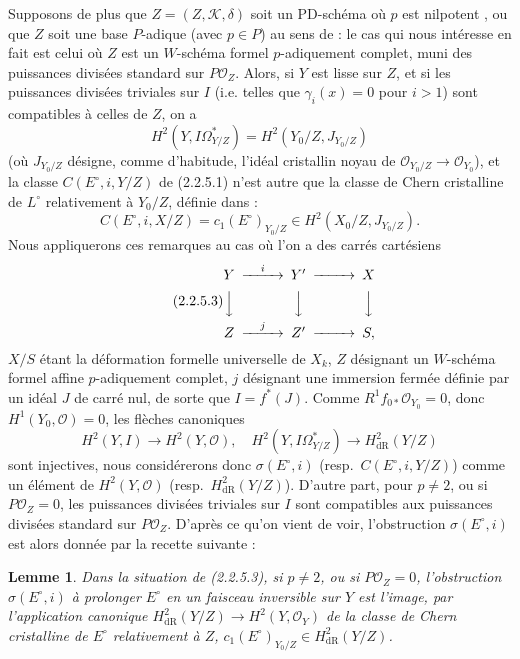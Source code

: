 \documentclass[12pt,a4paper]{article}
\theoremstyle{plain}
\newtheorem{lemma}[theorem]{Lemme}
\theoremstyle{definition}
\theoremstyle{remark}
\begin{document}
Supposons de plus que $Z = (Z, \mathcal{K}, \delta)$ soit un PD-sch\'ema o\`u $p$ est nilpotent \cite{Berthelot}, ou que $Z$ soit une base $P$-adique (avec $p \in P$) au sens de \cite[7.17]{BerthelotOgus} : le cas qui nous int\'eresse en fait est celui o\`u $Z$ est un $W$-sch\'ema formel $p$-adiquement complet, muni des puissances divis\'ees standard sur $P\mathcal{O}_Z$. Alors, si $Y$ est lisse sur $Z$, et si les puissances divis\'ees triviales sur $I$ (i.e. telles que $\gamma_i(x) = 0$ pour $i > 1$) sont compatibles \`a celles de $Z$, on a
\[
H^2(Y, I\Omega^*_{Y/Z}) = H^2(Y_0/Z, J_{Y_0/Z})
\]
(o\`u $J_{Y_0/Z}$ d\'esigne, comme d'habitude, l'id\'eal cristallin noyau de $\mathcal{O}_{Y_0/Z} \to \mathcal{O}_{Y_0}$), et la classe $C(E^\circ, i, Y/Z)$ de (2.2.5.1) n'est autre que la classe de Chern cristalline de $L^\circ$ relativement \`a $Y_0/Z$, d\'efinie dans \cite{BerthelotIllusie} :
\begin{equation}\tag{2.2.5.2}
C(E^\circ, i, X/Z) = c_1(E^\circ)_{Y_0/Z} \in H^2(X_0/Z, J_{Y_0/Z}). 
\end{equation}
Nous appliquerons ces remarques au cas o\`u l'on a des carr\'es cart\'esiens
\begin{equation}\tag{2.2.5.3}
\begin{CD}
Y @>{i}>> Y' @>>> X \\
@VVV @VVV @VVV \\
Z @>{j}>> Z' @>>> S,
\end{CD} 
\end{equation}
$X/S$ \'etant la d\'eformation formelle universelle de $X_k$, $Z$ d\'esignant un $W$-sch\'ema formel affine $p$-adiquement complet, $j$ d\'esignant une immersion ferm\'ee d\'efinie par un id\'eal $J$ de carr\'e nul, de sorte que $I = f^*(J)$. Comme $R^1f_{0*}\mathcal{O}_{Y_0} = 0$, donc $H^1(Y_0, \mathcal{O}) = 0$, les fl\`eches canoniques
\[
H^2(Y, I) \longrightarrow H^2(Y, \mathcal{O}), \quad H^2(Y, I\Omega^*_{Y/Z}) \longrightarrow H^2_\mathrm{dR}(Y/Z)
\]
sont injectives, nous consid\'ererons donc $\sigma(E^\circ, i)$ (resp.\ $C(E^\circ, i, Y/Z)$) comme un \'el\'ement de $H^2(Y, \mathcal{O})$ (resp.\ $H^2_\mathrm{dR}(Y/Z)$). D'autre part, pour $p \neq 2$, ou si $P\mathcal{O}_Z = 0$, les puissances divis\'ees triviales sur $I$ sont compatibles aux puissances divis\'ees standard sur $P\mathcal{O}_Z$. D'apr\`es ce qu'on vient de voir, l'obstruction $\sigma(E^\circ, i)$ est alors donn\'ee par la recette suivante :

\begin{lemma}\label{lem:2.2.6}
Dans la situation de (2.2.5.3), si $p \neq 2$, ou si $P\mathcal{O}_Z = 0$, l'obstruction $\sigma(E^\circ, i)$ \`a prolonger $E^\circ$ en un faisceau inversible sur $Y$ est l'image, par l'application canonique $H^2_\mathrm{dR}(Y/Z) \to H^2(Y, \mathcal{O}_Y)$ de la classe de Chern cristalline de $E^\circ$ relativement \`a $Z$, $c_1(E^\circ)_{Y_0/Z} \in H^2_\mathrm{dR}(Y/Z)$.
\end{lemma}
\end{document}
